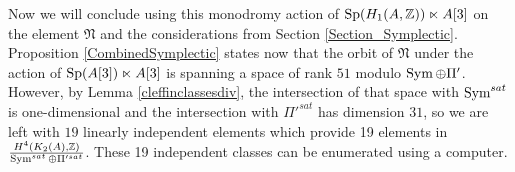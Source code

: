 Now we will conclude using this monodromy action of $\operatorname{Sp}(H_1(A,\mathbb{Z}))\ltimes A[3]$ on the element $\mathfrak{N}$ and the considerations from Section \ref{Section_Symplectic}. 
Proposition \ref{CombinedSymplectic} states now that
the orbit of $\mathfrak{N}$ under the action of $\operatorname{Sp}(A[3])\ltimes A[3]$ is spanning a space of rank $51$ modulo $\operatorname{Sym}\oplus\Pi'$. However, by Lemma \ref{cleffinclassesdiv}, the intersection of that space with $\operatorname{Sym}^{sat}$ is one-dimensional and the intersection with $\Pi'^{sat}$ has dimension $31$, so we are left with $19$ linearly independent elements which provide 19 elements in $\frac{H^4(K_2(A),\mathbb{Z})}{\operatorname{Sym}^{sat}\oplus\Pi'^{sat}}$.
These 19 independent classes can be enumerated using a computer.
